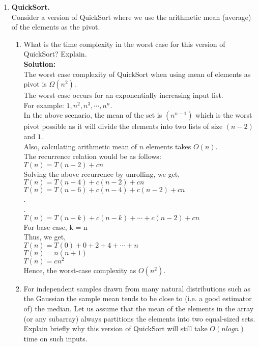\documentclass[12pt]{article}
\begin{document}
\begin{enumerate}
\item  \textbf{QuickSort.}\\
Consider a version of QuickSort where we use the arithmetic mean (average) of the elements as the pivot.
\begin{enumerate}
\item What is the time complexity in the worst case for this version of QuickSort? Explain.\\
\textbf{Solution:}\\
The worst case complexity of QuickSort when using mean of elements as pivot is $\Omega(n^2)$.\\
The worst case occurs for an exponentially increasing input list. \\
For example: $1, n^2, n^3, \cdots, n^n$.\\
In the above scenario, the mean of the set is $(n^{n-1})$ which is the worst pivot possible as it will divide the elements into two lists of size $(n-2)$ and $1$.\\
Also, calculating arithmetic mean of $n$ elements takes $O(n)$.\\
The recurrence relation would be as follows:\\
$T(n) = T(n - 2) + cn$\\
Solving the above recurrence by unrolling, we get,\\
$T(n) = T(n - 4) + c(n - 2) + cn$\\
$T(n) = T(n - 6) + c(n - 4) + c(n - 2) + cn$\\
.\\
.\\
$T(n) = T(n - k) + c(n - k) + \cdots + c(n - 2) + cn$\\
For base case, k = n\\
Thus, we get,\\
$T(n) = T(0) + 0 + 2 + 4 + \cdots + n$\\
$T(n) = n(n + 1)$\\
$T(n) = c n^2$\\
Hence, the worst-case complexity as $O(n^2)$.\\
\item For independent samples drawn from many natural distributions such as the Gaussian the sample mean tends to be close to (i.e. a good estimator of) the median. Let us assume that the mean of the elements in the array (or any subarray) always partitions the elements into two equal-sized sets. Explain briefly why this version of QuickSort will still take $O(n log n)$ time on such inputs.\\

\end{enumerate}
\end{enumerate}
\end{document}

